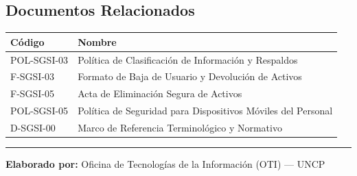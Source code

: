 \documentclass[10pt,letterpaper]{article}
\begin{document}
\subsection{Documentos Relacionados}\label{documentos-relacionados}

{\setlength{\RaggedRightRightskip}{0pt plus 5em}\small\sloppy \begin{longtable}[]{@{}
  >{\hspace{0pt}\RaggedRight\arraybackslash}p{}
  >{\hspace{0pt}\RaggedRight\arraybackslash}p{}@{}}
\toprule\noalign{}
\begin{minipage}[b]{\linewidth}\raggedright
Código
\end{minipage} & \begin{minipage}[b]{\linewidth}\raggedright
Nombre
\end{minipage} \\
\midrule\noalign{}
\endhead
\bottomrule\noalign{}
\endlastfoot
POL-SGSI-03 & Política de Clasificación de Información y Respaldos \\
F-SGSI-03 & Formato de Baja de Usuario y Devolución de Activos \\
F-SGSI-05 & Acta de Eliminación Segura de Activos \\
POL-SGSI-05 & Política de Seguridad para Dispositivos Móviles del
Personal \\
D-SGSI-00 & Marco de Referencia Terminológico y Normativo \\
\end{longtable}\normalsize}

\begin{center}\rule{0.5\linewidth}{0.5pt}\end{center}

\textbf{Elaborado por:} Oficina de Tecnologías de la Información (OTI)
--- UNCP
\end{document}
